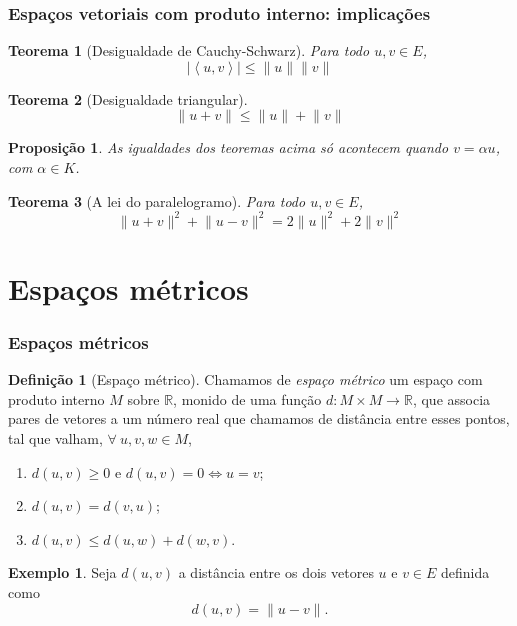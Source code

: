 \documentclass[10pt]{beamer}
\theoremstyle{plain}
\newtheorem{teorema}{Teorema}[section]
\newtheorem{proposicao}{Proposição}[section]
\theoremstyle{definition}
\newtheorem{definicao}{Definição}[section]
\newtheorem{exemplo}{Exemplo}[section]
\begin{document}
	\begin{frame}
		\frametitle{Espaços vetoriais com produto interno: implicações}
		
		\begin{teorema}[Desigualdade de Cauchy-Schwarz]
			Para todo $u,v \in E$,
			$$\left|\left < u,v\right >\right| \leq \lVert u\rVert \lVert v\rVert$$
		\end{teorema}
	
		\begin{teorema}[Desigualdade triangular]
			$$\lVert u+v\rVert \leq \lVert u\rVert + \lVert v\rVert$$
		\end{teorema}
	
		\begin{proposicao}
			As igualdades dos teoremas acima só acontecem quando $v = \alpha u$, com $\alpha\in K$.
		\end{proposicao}
	
		\begin{teorema}[A lei do paralelogramo]
			Para todo $u,v\in E$, $$\lVert u+v\rVert^2 + \lVert u-v\rVert^2 = 2\lVert u\rVert^2 + 2\lVert v\rVert^2$$
		\end{teorema}
	\end{frame}

	\section{Espaços métricos}
	
	\begin{frame}
		\frametitle{Espaços métricos}
		
		\begin{definicao}[Espaço métrico]
			Chamamos de \textit{espaço métrico} um espaço com produto interno $M$ sobre $\mathbb{R}$, monido de uma função $d: M\times M \longrightarrow \mathbb{R}$, que associa pares de vetores a um número real que chamamos de distância entre esses pontos, tal que valham, $\forall \ u,v,w \in M$,
			\begin{enumerate}
				\item $d(u,v) \geq 0$ e $d(u,v) = 0 \iff u = v$; 
				\item $d(u,v) = d(v,u)$;
				\item $d(u,v) \leq d(u,w) + d(w,v)$.
			\end{enumerate}
		\end{definicao}
	
		\begin{exemplo}
			Seja $d(u,v)$ a distância entre os dois vetores $u$ e $v\in E$ definida como $$d(u,v) = \lVert u-v\rVert.$$
		\end{exemplo}
	\end{frame}
\end{document}
